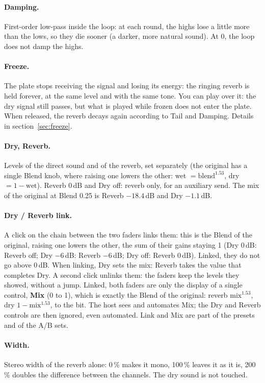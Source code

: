 \documentclass[a4paper,11pt]{article}
\newcommand{\dB}{\,dB}
\begin{document}
\paragraph{Damping.} First-order low-pass inside the loop: at each round, the highs lose a
little more than the lows, so they die sooner (a darker, more natural sound). At 0, the loop
does not damp the highs.

\paragraph{Freeze.} The plate stops receiving the signal and losing its energy: the ringing
reverb is held forever, at the same level and with the same tone. You can play over it: the
dry signal still passes, but what is played while frozen does not enter the plate. When
released, the reverb decays again according to Tail and Damping. Details in
section~\ref{sec:freeze}.

\paragraph{Dry, Reverb.} Levels of the direct sound and of the reverb, set separately (the
original has a single Blend knob, where raising one lowers the other: wet $=
\mathrm{blend}^{1.53}$, dry $= 1 - \text{wet}$). Reverb 0\dB{} and Dry off: reverb only, for an
auxiliary send. The mix of the original at Blend 0.25 is Reverb $-18.4$\dB{} and Dry
$-1.1$\dB.

\paragraph{Dry / Reverb link.} A click on the chain between the two faders links them: this is
the Blend of the original, raising one lowers the other, the sum of their gains staying 1 (Dry
0\dB: Reverb off; Dry $-6$\dB: Reverb $-6$\dB; Dry off: Reverb 0\dB). Linked, they do not go
above 0\dB. When linking, Dry sets the mix: Reverb takes the value that completes Dry. A second
click unlinks them: the faders keep the levels they showed, without a jump. Linked, both faders
are only the display of a single control, \textbf{Mix} (0 to 1), which is exactly the Blend of
the original: reverb $\mathrm{mix}^{1.53}$, dry $1 - \mathrm{mix}^{1.53}$, to the bit. The host
sees and automates Mix; the Dry and Reverb controls are then ignored, even automated. Link and
Mix are part of the presets and of the A/B sets.

\paragraph{Width.} Stereo width of the reverb alone: 0\,\% makes it mono, 100\,\% leaves it as
it is, 200\,\% doubles the difference between the channels. The dry sound is not touched.
\end{document}

